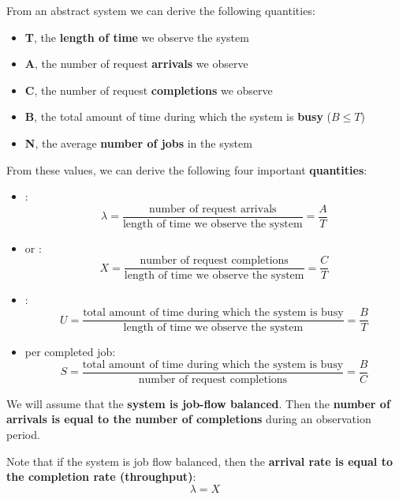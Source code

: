 From an abstract system we can derive the following quantities:
\begin{itemize}
	\item \textbf{T}, the \textbf{length of time} we observe the system
	\item \textbf{A}, the number of request \textbf{arrivals} we observe
	\item \textbf{C}, the number of request \textbf{completions} we observe
	\item \textbf{B}, the total amount of time during which the system is \textbf{busy} ($B \le T$)
	\item \textbf{N}, the average \textbf{number of jobs} in the system
\end{itemize}
From these values, we can derive the following four important \textbf{quantities}:
\begin{itemize}
	\item {}:
	\begin{equation}\label{eq: arrival rate}
		\lambda = \dfrac{\text{number of request arrivals}}{\text{length of time we observe the system}} = \dfrac{A}{T}
	\end{equation}
	
	\item {} or :
	\begin{equation}
		X = \dfrac{\text{number of request completions}}{\text{length of time we observe the system}} = \dfrac{C}{T}
	\end{equation}
	
	\item {}:
	\begin{equation}
		U = \dfrac{\text{total amount of time during which the system is busy}}{\text{length of time we observe the system}} = \dfrac{B}{T}
	\end{equation}
	
	\item {} per completed job:
	\begin{equation}
		S = \dfrac{\text{total amount of time during which the system is busy}}{\text{number of request completions}} = \dfrac{B}{C}
	\end{equation}
\end{itemize}
We will assume that the \textbf{system is job-flow balanced}. Then the \textbf{number of arrivals is equal to the number of completions} during an observation period.

\highspace
Note that if the system is job flow balanced, then the \textbf{arrival rate is equal to the completion rate (throughput)}:
\begin{equation*}
	\lambda = X
\end{equation*}

